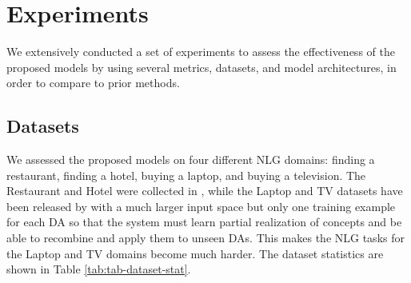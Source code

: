 \documentclass[11pt,a4paper]{article}
\begin{document}
\section{Experiments}\label{sec:experiments}
We extensively conducted a set of experiments to assess the effectiveness of the proposed models by using several metrics, datasets, and model architectures, in order to compare to prior methods.
\subsection{Datasets}\label{subsec:datasets}
We assessed the proposed models on four different NLG domains: finding a restaurant, finding a hotel, buying a laptop, and buying a television. The Restaurant and Hotel were collected in \cite{wensclstm15}, while the Laptop and TV datasets have been released by \cite{wen2016multi} with a much larger input space but only one training example for each DA so that the system must learn partial realization of concepts and be able to recombine and apply them to unseen DAs. This makes the NLG tasks for the Laptop and TV domains become much harder. The dataset statistics are shown in Table \ref{tab:tab-dataset-stat}.
\begin{table}[!ht]
\centering
\caption{Dataset statistics.}
\label{tab:tab-dataset-stat}
\end{table}
\end{document}
